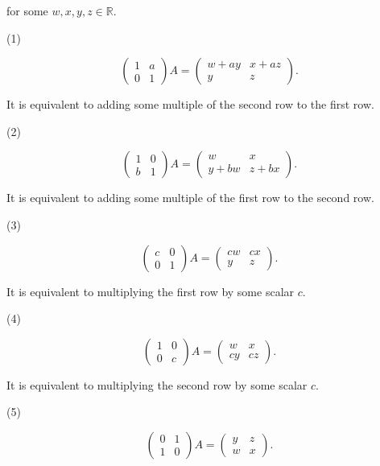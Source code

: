 for some \(w,x,y,z \in \mathbb{R}\).

(1)

\[\begin{pmatrix}
1 & a \\
0 & 1
\end{pmatrix}A = \begin{pmatrix}
{w + ay} & {x + az} \\
y & z
\end{pmatrix}.\]

It is equivalent to adding some multiple of the second row to the first row.

(2)

\[\begin{pmatrix}
1 & 0 \\
b & 1
\end{pmatrix}A = \begin{pmatrix}
w & x \\
{y + bw} & {z + bx}
\end{pmatrix}.\]

It is equivalent to adding some multiple of the first row to the second row.

(3)

\[\begin{pmatrix}
c & 0 \\
0 & 1
\end{pmatrix}A = \begin{pmatrix}
{cw} & {cx} \\
y & z
\end{pmatrix}.\]

It is equivalent to multiplying the first row by some scalar \(c\).

(4)

\[\begin{pmatrix}
1 & 0 \\
0 & c
\end{pmatrix}A = \begin{pmatrix}
w & x \\
{cy} & {cz}
\end{pmatrix}.\]

It is equivalent to multiplying the second row by some scalar \(c\).

(5)

\[\begin{pmatrix}
0 & 1 \\
1 & 0
\end{pmatrix}A = \begin{pmatrix}
y & z \\
w & x
\end{pmatrix}.\]

